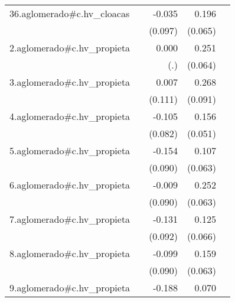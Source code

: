 {\begin{longtable}{l*{4}{D{.}{.}{-1}}}
\addlinespace
36.aglomerado#c.hv\_cloacas&                     &      -0.035         &       0.196\sym{**} &                     \\
            &                     &     (0.097)         &     (0.065)         &                     \\
\addlinespace
2.aglomerado#c.hv\_propieta&                     &       0.000         &       0.251\sym{***}&                     \\
            &                     &         (.)         &     (0.064)         &                     \\
\addlinespace
3.aglomerado#c.hv\_propieta&                     &       0.007         &       0.268\sym{**} &                     \\
            &                     &     (0.111)         &     (0.091)         &                     \\
\addlinespace
4.aglomerado#c.hv\_propieta&                     &      -0.105         &       0.156\sym{**} &                     \\
            &                     &     (0.082)         &     (0.051)         &                     \\
\addlinespace
5.aglomerado#c.hv\_propieta&                     &      -0.154         &       0.107         &                     \\
            &                     &     (0.090)         &     (0.063)         &                     \\
\addlinespace
6.aglomerado#c.hv\_propieta&                     &      -0.009         &       0.252\sym{***}&                     \\
            &                     &     (0.090)         &     (0.063)         &                     \\
\addlinespace
7.aglomerado#c.hv\_propieta&                     &      -0.131         &       0.125         &                     \\
            &                     &     (0.092)         &     (0.066)         &                     \\
\addlinespace
8.aglomerado#c.hv\_propieta&                     &      -0.099         &       0.159\sym{*}  &                     \\
            &                     &     (0.090)         &     (0.063)         &                     \\
\addlinespace
9.aglomerado#c.hv\_propieta&                     &      -0.188\sym{*}  &       0.070         &                     \\

\end{longtable}}
